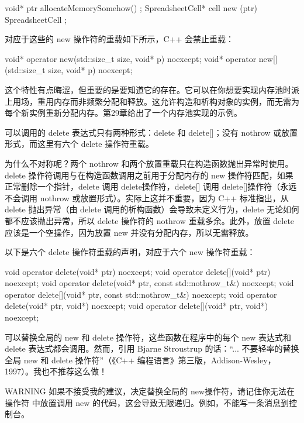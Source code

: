 \begin{cpp}
void* ptr { allocateMemorySomehow() };
SpreadsheetCell* cell { new (ptr) SpreadsheetCell {} };
\end{cpp}

对应于这些的 new 操作符的重载如下所示，C++ 会禁止重载：

\begin{cpp}
void* operator new(std::size_t size, void* p) noexcept;
void* operator new[](std::size_t size, void* p) noexcept;
\end{cpp}

这个特性有点晦涩，但重要的是要知道它的存在。它可以在你想要实现内存池时派上用场，重用内存而非频繁分配和释放。这允许构造和析构对象的实例，而无需为每个新实例重新分配内存。第29章给出了一个内存池实现的示例。


可以调用的 delete 表达式只有两种形式：delete 和 delete[]；没有 nothrow 或放置形式，而这里有六个 delete 操作符重载。

为什么不对称呢？两个 nothrow 和两个放置重载只在构造函数抛出异常时使用。delete 操作符调用与在构造函数调用之前用于分配内存的 new 操作符匹配，如果正常删除一个指针，delete 调用 delete操作符，delete[] 调用 delete[]操作符（永远不会调用 nothrow 或放置形式）。实际上这并不重要，因为 C++ 标准指出，从 delete 抛出异常（由 delete 调用的析构函数）会导致未定义行为，delete 无论如何都不应该抛出异常，所以 delete 操作符的 nothrow 重载多余。此外，放置 delete 应该是一个空操作，因为放置 new 并没有分配内存，所以无需释放。

以下是六个 delete 操作符重载的声明，对应于六个 new 操作符重载：

\begin{cpp}
void operator delete(void* ptr) noexcept;
void operator delete[](void* ptr) noexcept;
void operator delete(void* ptr, const std::nothrow_t&) noexcept;
void operator delete[](void* ptr, const std::nothrow_t&) noexcept;
void operator delete(void* ptr, void*) noexcept;
void operator delete[](void* ptr, void*) noexcept;
\end{cpp}


可以替换全局的 new 和 delete 操作符，这些函数在程序中的每个 new 表达式和 delete 表达式都会调用。然而，引用 Bjarne Stroustrup 的话：“... 不要轻率的替换全局  new 和 delete 操作符”（《C++ 编程语言》第三版，Addison-Wesley，1997）。我也不推荐这么做！

\begin{myWarning}{WARNING}
如果不接受我的建议，决定替换全局的 new操作符，请记住你无法在 操作符 中放置调用 new 的代码，这会导致无限递归。例如，不能写一条消息到控制台。
\end{myWarning}

